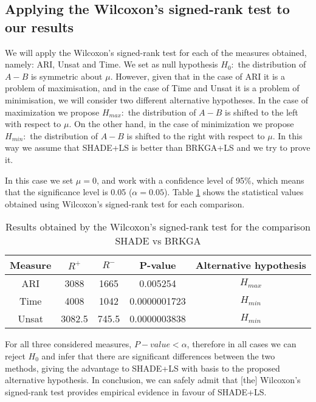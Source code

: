 
\subsection{Applying the Wilcoxon's signed-rank test to our results}

We will apply the Wilcoxon's signed-rank test for each of the measures obtained, namely: ARI, Unsat and Time. We set as null hypothesis $H_0: $ the distribution of $A - B$ is symmetric about $\mu$. However, given that in the case of ARI it is a problem of maximisation, and in the case of Time and Unsat it is a problem of minimisation, we will consider two different alternative hypotheses. In the case of maximization we propose $H_{max}:$ the distribution of $A - B$ is shifted to the left with respect to $\mu$. On the other hand, in the case of minimization we propose $H_{min}:$ the distribution of $A - B$ is shifted to the right with respect to $\mu$. In this way we assume that SHADE+LS is better than BRKGA+LS and we try to prove it.

In this case we set $\mu = 0$, and work with a confidence level of 95\%, which means that the significance level is 0.05 ($\alpha = 0.05$). Table \ref{tab:freqTest} shows the statistical values obtained using Wilcoxon's signed-rank test for each comparison.

\begin{table}[!htp]
	\centering
	\setlength{\tabcolsep}{7pt}
	\renewcommand{\arraystretch}{1.4}
	\begin{tabular}{ccccc}
		\hline
		Measure & $R^{+}$ & $R^{-}$ & P-value & Alternative hypothesis  \\
		\hline
		ARI & 3088 & 1665 & 0.005254 & $H_{max}$ \\
		Time & 4008 & 1042 & 0.0000001723 & $H_{min}$ \\
		Unsat & 3082.5 & 745.5 & 0.0000003838 & $H_{min}$ \\
		\hline
	\end{tabular}
	\caption{Results obtained by the Wilcoxon's signed-rank test for the comparison SHADE vs BRKGA}
	\label{tab:freqTest}
\end{table}

For all three considered measures, $P-value < \alpha$, therefore in all cases we can reject $H_0$ and infer that there are significant differences between the two methods, giving the advantage to SHADE+LS with basis to the proposed alternative hypothesis. In conclusion, we can safely admit that [the] Wilcoxon's signed-rank test provides empirical evidence in favour of SHADE+LS.


